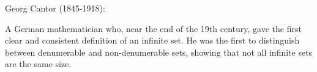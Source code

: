 Georg Cantor (1845-1918):
\par
A German mathematician who, near the end of the 19th
century, gave the first clear and consistent definition
of an infinite set. He was the first to distinguish between
denumerable and non-denumerable sets, showing that not all
infinite sets are the same size.
